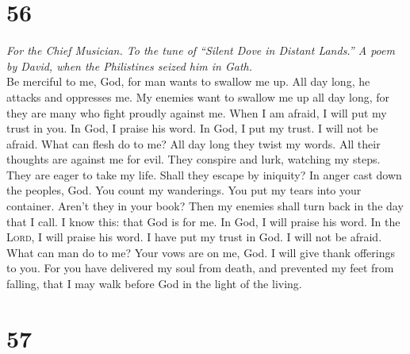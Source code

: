 \hypertarget{section-55}{%
\section{56}\label{section-55}}

\emph{For the Chief Musician. To the tune of ``Silent Dove in Distant
Lands.'' A poem by David, when the Philistines seized him in Gath.}\\
 Be merciful to me, God, for man wants to swallow me up.
All day long, he attacks and oppresses me.  My enemies
want to swallow me up all day long, for they are many who fight proudly
against me.  When I am afraid, I will put my trust in you.
 In God, I praise his word. In God, I put my trust. I will
not be afraid. What can flesh do to me?  All day long they
twist my words. All their thoughts are against me for evil.
 They conspire and lurk, watching my steps. They are eager
to take my life.  Shall they escape by iniquity? In anger
cast down the peoples, God.  You count my wanderings. You
put my tears into your container. Aren't they in your book?
 Then my enemies shall turn back in the day that I call. I
know this: that God is for me.  In God, I will praise his
word. In the \textsc{Lord}, I will praise his word.  I
have put my trust in God. I will not be afraid. What can man do to me?
 Your vows are on me, God. I will give thank offerings to
you.  For you have delivered my soul from death, and
prevented my feet from falling, that I may walk before God in the light
of the living.

\hypertarget{section-56}{%
\section{57}\label{section-56}}

